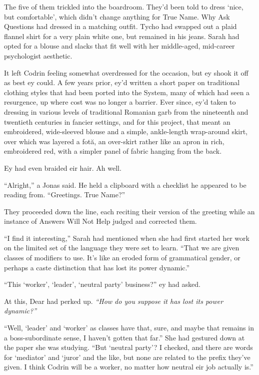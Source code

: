The five of them trickled into the boardroom. They'd been told to dress `nice, but comfortable', which didn't change anything for True Name. Why Ask Questions had dressed in a matching outfit. Tycho had swapped out a plaid flannel shirt for a very plain white one, but remained in his jeans. Sarah had opted for a blouse and slacks that fit well with her middle-aged, mid-career psychologist aesthetic.

It left Codrin feeling somewhat overdressed for the occasion, but ey shook it off as best ey could. A few years prior, ey'd written a short paper on traditional clothing styles that had been ported into the System, many of which had seen a resurgence, up where cost was no longer a barrier. Ever since, ey'd taken to dressing in various levels of traditional Romanian garb from the nineteenth and twentieth centuries in fancier settings, and for this project, that meant an embroidered, wide-sleeved blouse and a simple, ankle-length wrap-around skirt, over which was layered a fotă, an over-skirt rather like an apron in rich, embroidered red, with a simpler panel of fabric hanging from the back.

Ey had even braided eir hair. Ah well.

``Alright,'' a Jonas said. He held a clipboard with a checklist he appeared to be reading from. ``Greetings. True Name?''

They proceeded down the line, each reciting their version of the greeting while an instance of Answers Will Not Help judged and corrected them.

``I find it interesting,'' Sarah had mentioned when she had first started her work on the limited set of the language they were set to learn. ``That we are given classes of modifiers to use. It's like an eroded form of grammatical gender, or perhaps a caste distinction that has lost its power dynamic.''

``This `worker', `leader', `neutral party' business?'' ey had asked.

At this, Dear had perked up. \emph{``How do you suppose it has lost its power dynamic?''}

``Well, `leader' and `worker' as classes have that, sure, and maybe that remains in a boss-subordinate sense, I haven't gotten that far.'' She had gestured down at the paper she was studying. ``But `neutral party'? I checked, and there are words for `mediator' and `juror' and the like, but none are related to the prefix they've given. I think Codrin will be a worker, no matter how neutral eir job actually is.''

